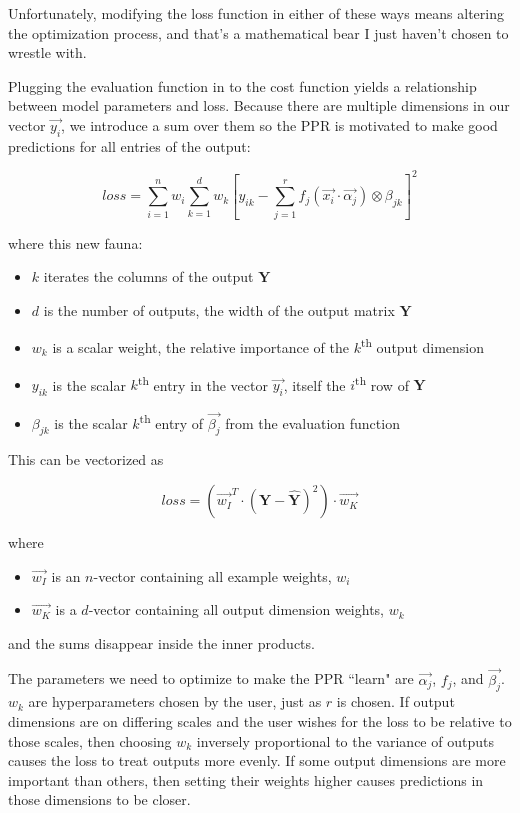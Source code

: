\documentclass[12pt]{article}
\begin{document}
Unfortunately, modifying the loss function in either of these ways means altering the optimization process, and that's a mathematical bear I just haven't chosen to wrestle with.\newline

Plugging the evaluation function in to the cost function yields a relationship between model parameters and loss. Because there are multiple dimensions in our vector $\vec{y_i}$, we introduce a sum over them so the PPR is motivated to make good predictions for all entries of the output:

$$loss = \sum_{i=1}^n w_i \sum_{k=1}^d w_k [y_{ik} - \sum_{j=1}^r f_j(\vec{x_i} \cdot \vec{\alpha_j}) \otimes \beta_{jk}]^2$$

where this new fauna:
\begin{itemize}
	\setlength\itemsep{-2mm}
	\item $k$ iterates the columns of the output $\pmb{Y}$
	\item $d$ is the number of outputs, the width of the output matrix $\pmb{Y}$
	\item $w_k$ is a scalar weight, the relative importance of the $k$\textsuperscript{th} output dimension
	\item $y_{ik}$ is the scalar $k$\textsuperscript{th} entry in the vector $\vec{y_i}$, itself the $i$\textsuperscript{th} row of $\pmb{Y}$
	\item $\beta_{jk}$ is the scalar $k$\textsuperscript{th} entry of $\vec{\beta_j}$ from the evaluation function
\end{itemize}

This can be vectorized as

$$loss = (\vec{w_I}^T \cdot (\pmb{Y} - \pmb{\hat{Y}})^2) \cdot \vec{w_K}$$

where
\begin{itemize}
	\setlength\itemsep{-2mm}
	\item $\vec{w_I}$ is an $n$-vector containing all example weights, $w_i$
	\item $\vec{w_K}$ is a $d$-vector containing all output dimension weights, $w_k$
\end{itemize}
and the sums disappear inside the inner products.\newline

The parameters we need to optimize to make the PPR ``learn" are $\vec{\alpha_j}$, $f_j$, and $\vec{\beta_j}$. $w_k$ are hyperparameters chosen by the user, just as $r$ is chosen. If output dimensions are on differing scales and the user wishes for the loss to be relative to those scales, then choosing $w_k$ inversely proportional to the variance of outputs causes the loss to treat outputs more evenly. If some output dimensions are more important than others, then setting their weights higher causes predictions in those dimensions to be closer.
\end{document}
